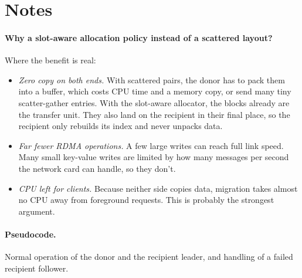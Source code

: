 \clearpage
\section*{Notes}

\paragraph{Why a slot-aware allocation policy instead of a scattered layout?}
Where the benefit is real:
\begin{itemize}
  \item \emph{Zero copy on both ends.}
  With scattered pairs, the donor has to pack them into a buffer, which costs CPU time and a memory copy, or send many tiny scatter-gather entries.
  With the slot-aware allocator, the blocks already are the transfer unit.
  They also land on the recipient in their final place, so the recipient only rebuilds its index and never unpacks data.
  \item \emph{Far fewer RDMA operations.}
  A few large writes can reach full link speed.
  Many small key-value writes are limited by how many messages per second the network card can handle, so they don't.
  \item \emph{CPU left for clients.}
  Because neither side copies data, migration takes almost no CPU away from foreground requests.
  This is probably the strongest argument.
\end{itemize}

\paragraph{Pseudocode.}
Normal operation of the donor and the recipient leader, and handling of a failed recipient follower.




